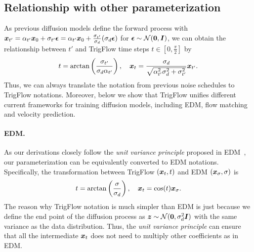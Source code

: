 \subsection{Relationship with other parameterization}
\label{appendix:relation_with_other_parameterization}
As previous diffusion models define the forward process with ${\bm{x}}_{t'} = \alpha_{t'} {\bm{x}}_0 + \sigma_{t'} \bm{\epsilon} = \alpha_{t'} {\bm{x}}_0 + \frac{\sigma_{t'}}{\sigma_d} (\sigma_d\bm{\epsilon})$ for $\bm{\epsilon}\sim {\mathcal{N}}({\bm{0}}, {\bm{I}})$, we can obtain the relationship between $t'$ and TrigFlow time steps $t\in[0,\frac{\pi}{2}]$ by
\begin{equation}
    t = \arctan\left( \frac{\sigma_{t'}}{\sigma_d \alpha_{t'}} \right), \quad 
    {\bm{x}}_t = \frac{\sigma_d}{\sqrt{\alpha_{t'}^2 \sigma_d^2 + \sigma_{t'}^2}}{\bm{x}}_{t'}.
\end{equation}
Thus, we can always translate the notation from previous noise schedules to TrigFlow notations. Moreover, below we show that TrigFlow unifies different current frameworks for training diffusion models, including EDM, flow matching and velocity prediction.

\paragraph{EDM.}
As our derivations closely follow the \textit{unit variance principle} proposed in EDM~\citep{karras2022edm}, our parameterization can be equivalently converted to EDM notations. Specifically, the transformation between TrigFlow $({\bm{x}}_t, t)$ and EDM $({\bm{x}}_\sigma, \sigma)$ is
\begin{equation}
\label{eq:appendix:relationship_edm_trigflow}
    t = \arctan\left( \frac{\sigma}{\sigma_d} \right),\quad 
    {\bm{x}}_t = \cos(t) {\bm{x}}_\sigma.
\end{equation}
The reason why TrigFlow notation is much simpler than EDM is just because we define the end point of the diffusion process as ${\bm{z}} \sim {\mathcal{N}}({\bm{0}}, \sigma_d^2 {\bm{I}})$ with the same variance as the data distribution. Thus, the \textit{unit variance principle} can ensure that all the intermediate ${\bm{x}}_t$ does not need to multiply other coefficients as in EDM.

